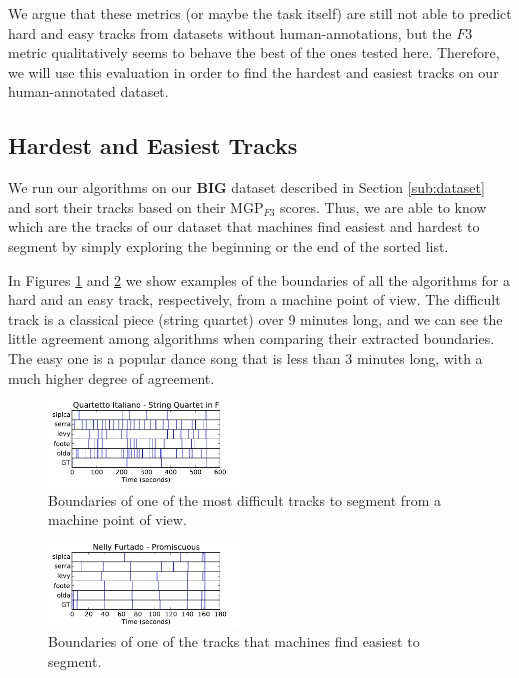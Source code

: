 \documentclass{article}
\begin{document}
We argue that these metrics (or maybe the task itself) are still not able to predict hard and easy tracks from datasets without human-annotations, but the $F3$ metric qualitatively seems to behave the best of the ones tested here.
Therefore, we will use this evaluation in order to find the hardest and easiest tracks on our human-annotated dataset.

\subsection{Hardest and Easiest Tracks}\label{sub:hard-easy}

We run our algorithms on our \textbf{BIG} dataset described in Section \ref{sub:dataset} and sort their tracks based on their MGP$_{F3}$ scores.
Thus, we are able to know which are the tracks of our dataset that machines find easiest and hardest to segment by simply exploring the beginning or the end of the sorted list.

In Figures \ref{fig:quartetto} and \ref{fig:promiscuous} we show examples of the boundaries of all the algorithms for a hard and an easy track, respectively, from a machine point of view.
The difficult track is a classical piece (string quartet) over 9 minutes long, and we can see the little agreement among algorithms when comparing their extracted boundaries.
The easy one is a popular dance song that is less than 3 minutes long, with a much higher degree of agreement.

\begin{figure}
  \centering
  \includegraphics[width=0.45\textwidth, height=0.13\textheight]{plots/Quartetto-machine.pdf}
  \caption{Boundaries of one of the most difficult tracks to segment from a machine point of view.}
  \label{fig:quartetto}
\end{figure}%

\begin{figure}
  \centering
  \includegraphics[width=0.45\textwidth, height=0.13\textheight]{plots/Promiscuous-machine.pdf}
  \caption{Boundaries of one of the tracks that machines find easiest to segment.}
  \label{fig:promiscuous}
\end{figure}%
\end{document}
